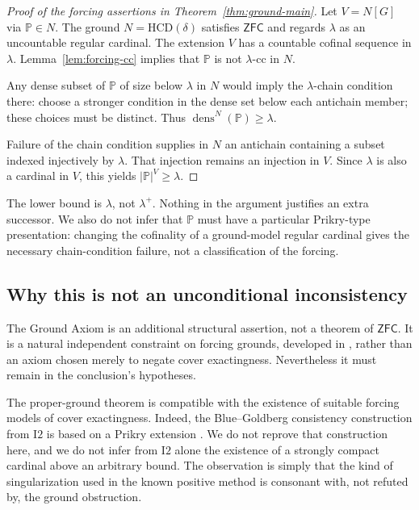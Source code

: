 \documentclass[11pt,letterpaper]{article}
\theoremstyle{definition}
\newcommand{\ZFC}{\mathsf{ZFC}}
\newcommand{\Itwo}{\mathrm{I2}}
\newcommand{\HCD}{\mathrm{HCD}}
\newcommand{\dens}{\operatorname{dens}}
\begin{document}
\begin{proof}[Proof of the forcing assertions in Theorem~\ref{thm:ground-main}]
Let $V=N[G]$ via $\mathbb P\in N$. The ground $N=\HCD(\delta)$ satisfies $\ZFC$ and regards $\lambda$ as an uncountable regular cardinal. The extension $V$ has a countable cofinal sequence in $\lambda$. Lemma~\ref{lem:forcing-cc} implies that $\mathbb P$ is not $\lambda$-cc in $N$.

Any dense subset of $\mathbb P$ of size below $\lambda$ in $N$ would imply the $\lambda$-chain condition there: choose a stronger condition in the dense set below each antichain member; these choices must be distinct. Thus $\dens^N(\mathbb P)\ge\lambda$.

Failure of the chain condition supplies in $N$ an antichain containing a subset indexed injectively by $\lambda$. That injection remains an injection in $V$. Since $\lambda$ is also a cardinal in $V$, this yields $|\mathbb P|^V\ge\lambda$.
\end{proof}

The lower bound is $\lambda$, not $\lambda^+$. Nothing in the argument justifies an extra successor. We also do not infer that $\mathbb P$ must have a particular Prikry-type presentation: changing the cofinality of a ground-model regular cardinal gives the necessary chain-condition failure, not a classification of the forcing.

\subsection{Why this is not an unconditional inconsistency}

The Ground Axiom is an additional structural assertion, not a theorem of $\ZFC$. It is a natural independent constraint on forcing grounds, developed in \cite{reitz}, rather than an axiom chosen merely to negate cover exactingness. Nevertheless it must remain in the conclusion's hypotheses.

The proper-ground theorem is compatible with the existence of suitable forcing models of cover exactingness. Indeed, the Blue--Goldberg consistency construction from $\Itwo$ is based on a Prikry extension \cite[Theorem 3.5]{cover}. We do not reprove that construction here, and we do not infer from $\Itwo$ alone the existence of a strongly compact cardinal above an arbitrary bound. The observation is simply that the kind of singularization used in the known positive method is consonant with, not refuted by, the ground obstruction.
\end{document}
